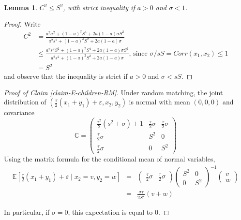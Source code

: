 \documentclass[
  12pt,
]{article}
\newtheorem{lemma}{Lemma}
\theoremstyle{definition}
\theoremstyle{definition}
\theoremstyle{definition}
\theoremstyle{definition}
\theoremstyle{remark}
\begin{document}
\begin{lemma}\label{C2}
 $C^2 \le S^2$, with strict inequality if $a > 0$ and $\sigma < 1$.

\end{lemma}
\begin{proof}
Write
\begin{align*}
C^{2}   &= \frac{
            a^{2}\sigma^{2}+(1-a)^{2}S^{4}+2a(1-a)\sigma S^{2}
         }{
           a^{2}s^{2}+(1-a)^{2}S^{2}+2a(1-a)\sigma
         } \\
    &\le \frac{
        a^{2}s^{2}S^{2}+(1-a)^{2}S^{4}+2a(1-a)\sigma S^{2}
      }{
        a^{2}s^{2}+(1-a)^{2}S^{2}+2a(1-a)\sigma
      }
      \textrm{, since }\sigma/sS = Corr(x_1,x_2) \le 1 \\
    &= S^{2}
\end{align*}
and observe that the inequality is strict if $a > 0$ and $\sigma < sS$.
\end{proof}

\begin{proof}[Proof of Claim \ref{claim-E-children-RM}]

Under random matching, the joint distribution of $\left( \frac{\tau }{2}\left(
x_{1}+y_{1}\right) +\varepsilon ,x_{2},y_{2}\right) $ is normal with mean 
$( 0,0,0)$ and covariance
\[
\mathbb{C}=\left( 
\begin{array}{lcr}
\frac{\tau ^{2}}{2}\left( s^{2}+\sigma \right) +1 & \frac{\tau }{2}\sigma  & 
\frac{\tau }{2}\sigma  \\ 
\frac{\tau }{2}\sigma  & S^{2} & 0 \\ 
\frac{\tau }{2}\sigma  & 0 & S^{2}%
\end{array}%
\right) 
\]%
Using the matrix formula for the conditional mean of normal variables,
\begin{eqnarray*}
\mathbb{E}\left[ \frac{\tau }{2}\left( x_{1}+y_{1}\right) +\varepsilon \mid
x_{2}=v,y_{2}=w\right]  &=&\left( 
\begin{array}{rr}
\frac{\tau }{2}\sigma  & \frac{\tau }{2}\sigma 
\end{array}%
\right) \left( 
\begin{array}{rr}
S^{2} & 0 \\ 
0 & S^{2}%
\end{array}%
\right) ^{-1}\left( 
\begin{array}{r}
v \\ 
w%
\end{array}%
\right)  \\
&=&\frac{\sigma \tau }{2S^{2}}\left( v+w\right) 
\end{eqnarray*}

In particular, if $\sigma =0$, this expectation is equal to 0.
\end{proof}
\end{document}
